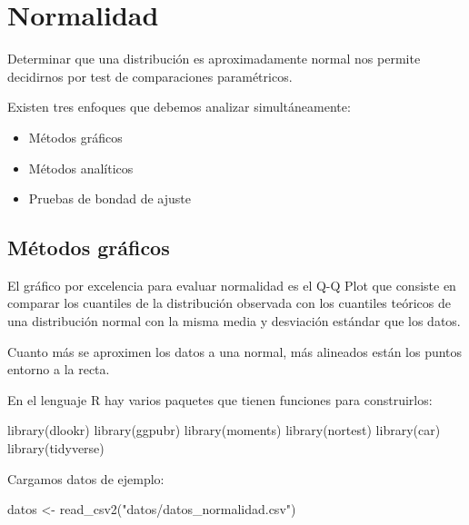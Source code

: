 \documentclass[
  spanish,
  a4paper,
]{scrbook}
\newenvironment{Shaded}{\begin{snugshade}}{\end{snugshade}}
\newcommand{\FunctionTok}[1]{\textcolor[rgb]{0.28,0.35,0.67}{#1}}
\newcommand{\NormalTok}[1]{\textcolor[rgb]{0.00,0.23,0.31}{#1}}
\newcommand{\OtherTok}[1]{\textcolor[rgb]{0.00,0.23,0.31}{#1}}
\newcommand{\StringTok}[1]{\textcolor[rgb]{0.13,0.47,0.30}{#1}}
\providecommand{\tightlist}{%
  \setlength{\itemsep}{0pt}\setlength{\parskip}{0pt}}
\begin{document}
\section{Normalidad}\label{normalidad}

Determinar que una distribución es aproximadamente normal nos permite
decidirnos por test de comparaciones paramétricos.

Existen tres enfoques que debemos analizar simultáneamente:

\begin{itemize}
\tightlist
\item
  Métodos gráficos
\item
  Métodos analíticos
\item
  Pruebas de bondad de ajuste
\end{itemize}

\subsection{Métodos gráficos}\label{muxe9todos-gruxe1ficos}

El gráfico por excelencia para evaluar normalidad es el Q-Q Plot que
consiste en comparar los cuantiles de la distribución observada con los
cuantiles teóricos de una distribución normal con la misma media y
desviación estándar que los datos.

Cuanto más se aproximen los datos a una normal, más alineados están los
puntos entorno a la recta.

En el lenguaje R hay varios paquetes que tienen funciones para
construirlos:

\begin{Shaded}
\begin{Highlighting}[]
\FunctionTok{library}\NormalTok{(dlookr)}
\FunctionTok{library}\NormalTok{(ggpubr)}
\FunctionTok{library}\NormalTok{(moments)}
\FunctionTok{library}\NormalTok{(nortest)}
\FunctionTok{library}\NormalTok{(car)}
\FunctionTok{library}\NormalTok{(tidyverse)}
\end{Highlighting}
\end{Shaded}

Cargamos datos de ejemplo:

\begin{Shaded}
\begin{Highlighting}[]
\NormalTok{datos }\OtherTok{\textless{}{-}} \FunctionTok{read\_csv2}\NormalTok{(}\StringTok{"datos/datos\_normalidad.csv"}\NormalTok{)}
\end{Highlighting}
\end{Shaded}
\end{document}
